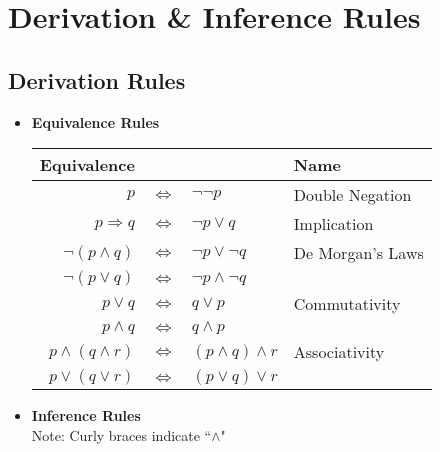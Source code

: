 \documentclass{article}
\begin{document}
\section{Derivation \& Inference Rules}
    \subsection{Derivation Rules}
        \begin{itemize}
            \item \textbf{Equivalence Rules}
            \hspace{0.5em}
        
            \begin{table}[htb]
                \begin{tabular}{rcl|l}
                    {Equivalence} & & & {Name} \\
                    \hline\hline
                    $p$ & $\iff$ & $\neg\neg{p}$ & Double Negation \\
                    \hline
                    $p \Rightarrow q$ & $\iff$ & $\neg{p} \lor q$ & Implication \\
                    \hline
                    $\neg(p \land q)$ & $\iff$ & $\neg{p} \lor \neg{q}$ & De Morgan's Laws \\
                    $\neg(p \lor q)$ & $\iff$ & $\neg{p} \land \neg{q}$ \\
                    \hline
                    $p \lor q$ & $\iff$ & $q \lor p$ & Commutativity \\
                    $p \land q$ & $\iff$ & $q \land p$ \\
                    \hline
                    $p \land (q \land r)$ & $\iff$ & $(p \land q) \land r$ & Associativity \\
                    $p \lor (q \lor r)$ & $\iff$ & $(p \lor q) \lor r$ \\
                \end{tabular}
            \end{table}
            \item \textbf{Inference Rules} \\
            \hspace{0.5em}
            Note: Curly braces indicate ``$\land$"
        

\end{itemize}
\end{document}
